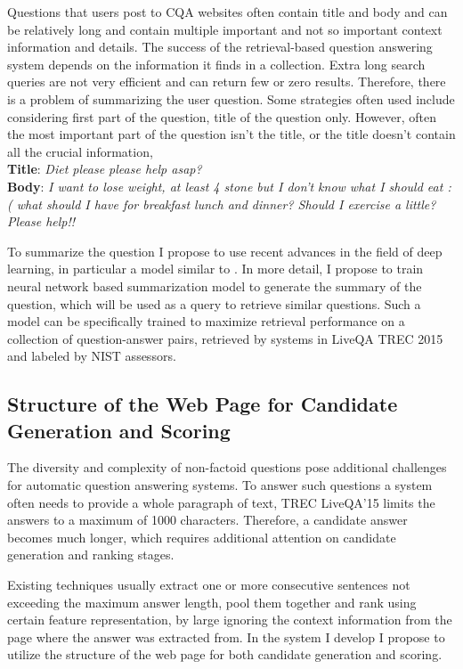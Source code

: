 Questions that users post to CQA websites often contain title and body and can be relatively long and contain multiple important and not so important context information and details.
The success of the retrieval-based question answering system depends on the information it finds in a collection.
Extra long search queries are not very efficient and can return few or zero results.
Therefore, there is a problem of summarizing the user question.
Some strategies often used include considering first part of the question, \eg title of the question only.
However, often the most important part of the question isn't the title, or the title doesn't contain all the crucial information, \eg\\
\textbf{Title}: \textit{Diet please please help asap?}\\
\textbf{Body}: \textit{I want to lose weight, at least 4 stone but I don't know what I should eat :( what should I have for breakfast lunch and dinner? Should I exercise a little? Please help!!}

To summarize the question I propose to use recent advances in the field of deep learning, in particular a model similar to \cite{rush-chopra-weston:2015:EMNLP}.
In more detail, I propose to train neural network based summarization model to generate the summary of the question, which will be used as a query to retrieve similar questions.
Such a model can be specifically trained to maximize retrieval performance on a collection of question-answer pairs, retrieved by systems in LiveQA TREC 2015 and labeled by NIST assessors.

\subsection{Structure of the Web Page for Candidate Generation and Scoring}
\label{sec:non-factoid:architecture:page-structure}

The diversity and complexity of non-factoid questions pose additional challenges for automatic question answering systems.
To answer such questions a system often needs to provide a whole paragraph of text, \eg TREC LiveQA'15 limits the answers to a maximum of 1000 characters.
Therefore, a candidate answer becomes much longer, which requires additional attention on candidate generation and ranking stages.

Existing techniques usually extract one or more consecutive sentences not exceeding the maximum answer length, pool them together and rank using certain feature representation, by large ignoring the context information from the page where the answer was extracted from.
In the system I develop I propose to utilize the structure of the web page for both candidate generation and scoring.

